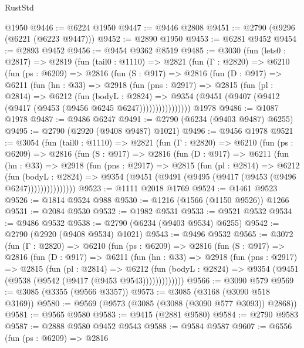 \begin{lexlean}{RustStd}
\begin{coremodule}
{\begin{coremodule}
{{{{{{{{{{{{{{{{{{{{{{{{{{    @1950
@9446 := @6224 @1950
@9447 := @9446 @2808
@9451 := @2790 (@9296 (@6221 (@6223 @9447)))
@9452 := @2890 @1950
@9453 := @6281 @9452
@9454 := @2893 @9452
@9456 := @9454 @9362 @8519
@9485 := @3030
    (fun (lets0 : @2817) =>
    @2819
      (fun (tail0 : @1110) =>
      @2821
        (fun (Γ : @2820) =>
        @6210
          (fun (ps : @6209) =>
          @2816
            (fun (S : @917) =>
            @2816
              (fun (D : @917) =>
              @6211
                (fun (hn : @33) =>
                @2918
                  (fun (pns : @2917) =>
                  @2815
                    (fun (pl : @2814) =>
                    @6212
                      (fun (bodyL : @2824) =>
                      @9354 (@9451 (@9407 (@9412 (@9417 (@9453 (@9456 @6245 @6247))))))))))))))))
    @1978
@9486 := @1087 @1978
@9487 := @9486 @6247
@9491 := @2790 (@6234 (@9403 @9487) @6255)
@9495 := @2790 (@2920 (@9408 @9487) @1021)
@9496 := @9456 @1978
@9521 := @3054
    (fun (tail0 : @1110) =>
    @2821
      (fun (Γ : @2820) =>
      @6210
        (fun (ps : @6209) =>
        @2816
          (fun (S : @917) =>
          @2816
            (fun (D : @917) =>
            @6211
              (fun (hn : @33) =>
              @2918
                (fun (pns : @2917) =>
                @2815
                  (fun (pl : @2814) =>
                  @6212
                    (fun (bodyL : @2824) =>
                    @9354 (@9451 (@9491 (@9495 (@9417 (@9453 (@9496 @6247)))))))))))))))
@9523 := @1111 @2018 @1769
@9524 := @1461 @9523
@9526 := @1814 @9524 @988
@9530 := @1216 (@1566 (@1150 @9526)) @1266
@9531 := @2084 @9530
@9532 := @1982 @9531
@9533 := @9521 @9532
@9534 := @9486 @9532
@9538 := @2790 (@6234 (@9403 @9534) @6255)
@9542 := @2790 (@2920 (@9408 @9534) @1021)
@9543 := @9496 @9532
@9565 := @3072
    (fun (Γ : @2820) =>
    @6210
      (fun (ps : @6209) =>
      @2816
        (fun (S : @917) =>
        @2816
          (fun (D : @917) =>
          @6211
            (fun (hn : @33) =>
            @2918
              (fun (pns : @2917) =>
              @2815
                (fun (pl : @2814) =>
                @6212
                  (fun (bodyL : @2824) =>
                  @9354 (@9451 (@9538 (@9542 (@9417 (@9453 @9543)))))))))))))
@9566 := @3090 @579
@9569 := @3085 (@3355 (@9566 @3357))
@9573 := @3085 (@3168 (@3090 @518 @3169))
@9580 := @9569 (@9573 (@3085 (@3088 (@3090 @577 @3093)) @2868))
@9581 := @9565 @9580
@9583 := @9415 (@2881 @9580)
@9584 := @2790 @9583
@9587 := @2888 @9580 @9452 @9543
@9588 := @9584 @9587
@9607 := @6556
    (fun (ps : @6209) =>
    @2816
}}}}}}}}}}}}}}}}}}}}}}}}}}
\end{coremodule}}
\end{coremodule}
\end{lexlean}
